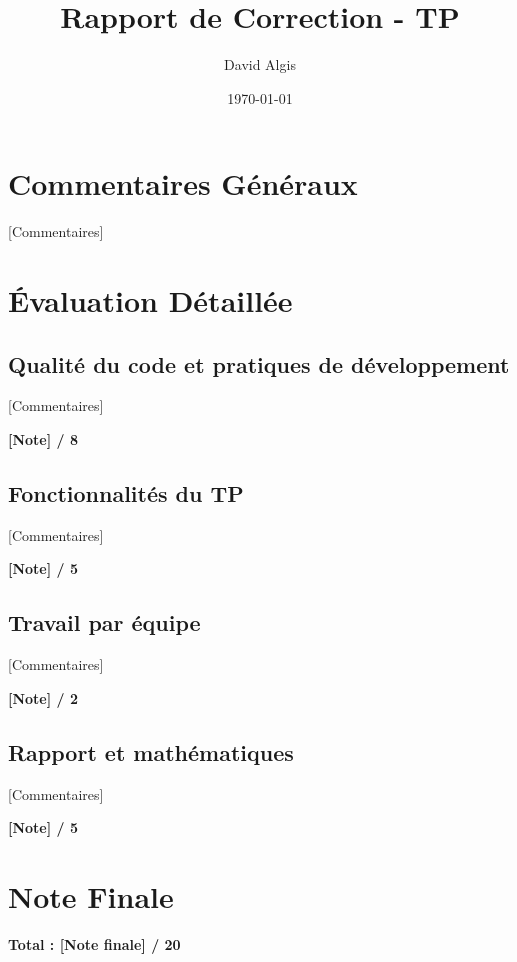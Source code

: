 \documentclass[a4paper,12pt]{article}
\title{Rapport de Correction - TP}
\author{David Algis}
\date{\today}
\begin{document}
\maketitle

\section*{Commentaires Généraux}

[Commentaires]

\section*{Évaluation Détaillée}

\subsection*{Qualité du code et pratiques de développement}

[Commentaires]

\textbf{\Large{[Note] / 8}}

\subsection*{Fonctionnalités du TP}

[Commentaires]

\textbf{\Large{[Note] / 5}}

\subsection*{Travail par équipe}

[Commentaires]

\textbf{\Large{[Note] / 2}}

\subsection*{Rapport et mathématiques}

[Commentaires]

\textbf{\Large{[Note] / 5}}

\section*{Note Finale}

\textbf{\Huge{Total : [Note finale] / 20}}
\end{document}
